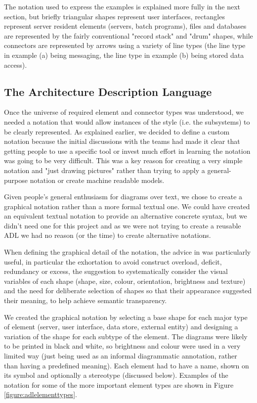   The notation used to express the examples is explained more fully in the next section, but briefly triangular shapes represent user interfaces, rectangles represent server resident elements (servers, batch programs), files and databases are represented by the fairly conventional "record stack" and "drum" shapes, while connectors are represented by arrows using a variety of line types (the line type in example (a) being messaging, the line type in example (b) being stored data access).

\subsection{The Architecture Description Language}

  Once the universe of required element and connector types was understood, we needed a notation that would allow instances of the style (i.e. the subsystems) to be clearly represented.  As explained earlier, we decided to define a custom notation because the initial discussions with the teams had made it clear that getting people to use a specific tool or invest much effort in learning the notation was going to be very difficult. This was a key reason for creating a very simple notation and "just drawing pictures" rather than trying to apply a general-purpose notation or create machine readable models.

  Given people's general enthusiasm for diagrams over text, we chose to create a graphical notation rather than a more formal textual one. We could have created an equivalent textual notation to provide an alternative concrete syntax, but we didn't need one for this project and as we were not trying to create a reusable ADL we had no reason (or the time) to create alternative notations.

  When defining the graphical detail of the notation, the advice in \cite{moody2009-notations} was particularly useful, in particular the exhortation to avoid construct overload, deficit, redundancy or excess, the suggestion to systematically consider the visual variables of each shape (shape, size, colour, orientation, brightness and texture) and the need for deliberate selection of shapes so that their appearance suggested their meaning, to help achieve semantic transparency.

  We created the graphical notation by selecting a base shape for each major type of element (server, user interface, data store, external entity) and designing a variation of the shape for each subtype of the element.  The diagrams were likely to be printed in black and white, so brightness and colour were used in a very limited way (just being used as an informal diagrammatic annotation, rather than having a predefined meaning).  Each element had to have a name, shown on its symbol and optionally a stereotype (discussed below).  Examples of the notation for some of the more important element types are shown in Figure \ref{figure:adlelementtypes}. 
  
